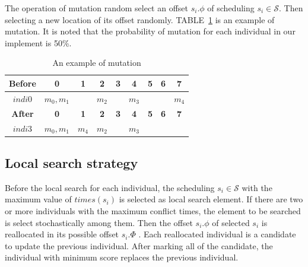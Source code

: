 \documentclass[journal]{IEEEtran}
\newcommand{\calS}{\mathcal{S}}
\theoremstyle{remark}
\begin{document}
The operation of mutation random select an offset $s_i.\phi$ of scheduling $s_i\in\calS$.
Then selecting a new location of its offset randomly.
TABLE~\ref{t:mutation} is an example of mutation.
It is noted that the probability of mutation for each individual in our implement is 50\%.
\begin{table}[!t]
	\renewcommand{\arraystretch}{1.3}
	\newcommand{\tabincell}[2]{\begin{tabular}{@{}#1@{}}#2\end{tabular}}
	\caption{An example of mutation}
	\label{t:mutation}
	\centering
	\begin{tabular}{|c||c||c||c||c||c||c||c||c|}
		\hline
		\textbf{Before}& 
		\textbf{0} & 
		\textbf{1} & 
		\textbf{2} & 
		\textbf{3} &
		\textbf{4} & 
		\textbf{5} & 
		\textbf{6} & 
		\textbf{7} \\		
		\hline
		$indi0$	&$m_0,m_1$&	&$m_2$&	&$m_3$& & &$m_4$\\		
		\hline
		\hline
		\textbf{After}& 
		\textbf{0} & 
		\textbf{1} & 
		\textbf{2} & 
		\textbf{3} &
		\textbf{4} & 
		\textbf{5} & 
		\textbf{6} & 
		\textbf{7} \\		
		\hline
		$indi3$	&$m_0,m_1$&$m_4$&$m_2$&	&$m_3$& & &\\			
		\hline
	\end{tabular}
\end{table}


\subsection{Local search strategy \label{s:loc}}

Before the local search for each individual,
 the scheduling $s_i\in\calS$ with the maximum value of $times(s_i)$ is selected as local search element.
If there are two or more individuals with the maximum conflict times,
 the element to be searched is select stochastically among them.
Then the offset $s_i.\phi$ of selected $s_i$ is reallocated in its possible offset $s_i.\Phi$ .
Each reallocated individual is a candidate to update the previous individual.
After marking all of the candidate, the individual with minimum score replaces the previous individual.
\end{document}
